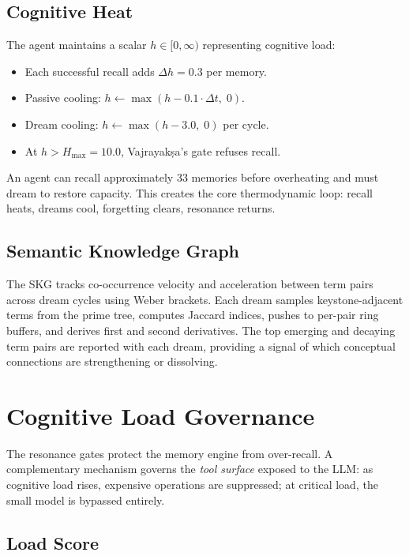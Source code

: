\documentclass[twocolumn,10pt]{article}
\begin{document}
\subsection{Cognitive Heat}

The agent maintains a scalar $h \in [0, \infty)$ representing
cognitive load:

\begin{itemize}[leftmargin=*,itemsep=1pt]
\item Each successful recall adds $\Delta h = 0.3$ per memory.
\item Passive cooling: $h \leftarrow \max(h - 0.1 \cdot \Delta t,\; 0)$.
\item Dream cooling: $h \leftarrow \max(h - 3.0,\; 0)$ per cycle.
\item At $h > H_{\max} = 10.0$, Vajrayak\d{s}a's gate refuses recall.
\end{itemize}

\noindent
An agent can recall approximately 33 memories before overheating and
must dream to restore capacity.  This creates the core thermodynamic
loop: recall heats, dreams cool, forgetting clears, resonance returns.

\subsection{Semantic Knowledge Graph}

The SKG tracks co-occurrence velocity and acceleration between term
pairs across dream cycles using Weber brackets.  Each dream samples
keystone-adjacent terms from the prime tree, computes Jaccard indices,
pushes to per-pair ring buffers, and derives first and second
derivatives.  The top emerging and decaying term pairs are reported
with each dream, providing a signal of which conceptual connections
are strengthening or dissolving.

\section{Cognitive Load Governance}

The resonance gates protect the memory engine from over-recall.  A
complementary mechanism governs the \textit{tool surface} exposed to the
LLM: as cognitive load rises, expensive operations are suppressed; at
critical load, the small model is bypassed entirely.

\subsection{Load Score}
\end{document}
